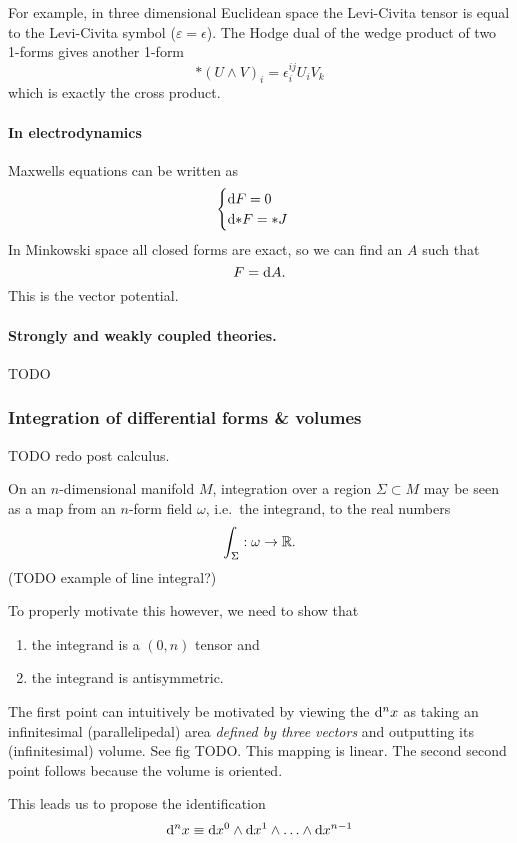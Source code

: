 For example, in three dimensional Euclidean space the Levi-Civita tensor is equal to the Levi-Civita symbol ($\varepsilon = \epsilon$). The Hodge dual of the wedge product of two 1-forms gives another 1-form
\[ *(U\wedge V)_i = \epsilon_i^{ij}U_iV_k \]
which is exactly the cross product.

\paragraph{In electrodynamics} Maxwells equations can be written as
\[ \begin{cases}
\operatorname{d \!}{F} = 0 \\ \operatorname{d \!}{*F} = *J
\end{cases} \]
In Minkowski space all closed forms are exact, so we can find an $A$ such that
\[ F = \operatorname{d \!}{A}. \]
This is the vector potential.
\paragraph{Strongly and weakly coupled theories.} TODO


\subsubsection{Integration of differential forms \& volumes}
TODO redo post calculus.

On an $n$-dimensional manifold $M$, integration over a region $\Sigma \subset M$ may be seen as a map from an $n$-form field $\omega$, i.e.\ the integrand, to the real numbers
\[ \int_\Sigma: \omega \to \mathbb{R}. \]
(TODO example of line integral?)

To properly motivate this however, we need to show that
\begin{enumerate}
\item the integrand is a $(0,n)$ tensor and
\item the integrand is antisymmetric.
\end{enumerate}
The first point can intuitively be motivated by viewing the $\operatorname{d \!}{^nx}$ as taking an infinitesimal (parallelipedal) area \textit{defined by three vectors} and outputting its (infinitesimal) volume. See fig TODO. This mapping is linear.
The second second point follows because the volume is oriented.

This leads us to propose the identification
\begin{equation}
\operatorname{d \!}{^nx} \equiv \operatorname{d \!}{x^0}\wedge \operatorname{d \!}{x^1}\wedge \ldots \wedge \operatorname{d \!}{x^{n-1}} \label{eq:diffTransfRule}
\end{equation}


